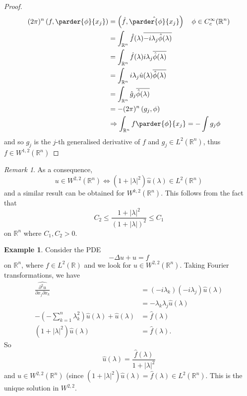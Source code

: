 \documentclass[10pt, oneside, reqno]{amsart}
\theoremstyle{plain}%
\numberwithin{equation}{section}
\theoremstyle{definition}
\newtheorem{exmp}[thm]{Example}
\theoremstyle{remark}
\newtheorem*{rem}{Remark}
\newcommand{\R}{\mathbb{R}}
\begin{document}
\begin{proof}
    \begin{align*}
        (2\pi)^n \left(f, \parder{\phi}{x_j} \right) &=  \left(\hat f, \hat{ \parder{\phi}{x_j}} \right) \quad \phi \in C^\infty_c(\R^n)\\
        &= \int_{\R^n} \hat f(\lambda) \overline{-i \lambda_j \hat \phi(\lambda)} \\
        &= \int_{\R^n} \hat f(\lambda) i \lambda_j \overline{\hat \phi(\lambda)} \\
        &= \int_{\R^n} i \lambda_j \hat u(\lambda) \overline{\hat \phi(\lambda)} \\
        &= \int_{\R^n} \hat g_j \overline{\hat \phi(\lambda)} \\
        &= -(2\pi)^n \left(g_j, \phi \right) \\
        &\Rightarrow \int_{\R^n} f \parder{\phi}{x_j} = -\int g_j \phi
    \end{align*} and so $g_j$ is the $j$-th generalised derivative of $f$ and $g_j \in L^2(\R^n)$, thus $f \in W^{1, 2}(\R^n)$   
\end{proof}

\begin{rem}
    As a consequence, \[
        u \in W^{2, 2}(\R^n) \iff \left(1 + |\lambda|^2 \right) \hat u(\lambda) \in L^2(\R^n)
    \] and a similar result can be obtained for $W^{k, 2}(\R^n)$.  This follows from the fact that \[
        C_2 \leq \frac{1 + |\lambda|^2}{(1 + |\lambda|)^2} \leq C_1
    \] on $\R^n$ where $C_1, C_2 > 0$.
\end{rem}

\begin{exmp}
    Consider the PDE \begin{equation}
        \label{eq:poisson_pde}
        -\Delta u + u = f
    \end{equation}
    on $\R^n$, where $f \in L^2(\R)$ and we look for $u \in W^{2, 2}(\R^n)$.  Taking Fourier transformations, we have \begin{align*}
        \hat{\frac{\partial^2 u}{\partial x_j \partial x_k}} &= (-i \lambda_k)(-i\lambda_j) \hat u(\lambda) \\
        &= - \lambda_k \lambda_j \hat u(\lambda) \\
        - \left(-\sum_{k=1}^n \lambda_k^2 \right) \hat u(\lambda) + \hat u(\lambda) &= \hat f(\lambda) \\
        \left(1 + |\lambda|^2 \right) \hat u(\lambda) &= \hat f(\lambda). 
    \end{align*}  So \[
        \hat u(\lambda) = \frac{\hat f(\lambda)}{1 + |\lambda|^2}
    \] and $u \in W^{2, 2}(\R^n)$ (since $\left(1 + |\lambda|^2\right) \hat u (\lambda) = \hat f(\lambda) \in L^2(\R^n)$.  This is the unique solution in $W^{2, 2}$.
\end{exmp}
\end{document}
